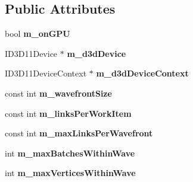 \subsection*{Public Attributes}
\begin{DoxyCompactItemize}
\item 
\hypertarget{classbt_soft_body_link_data_d_x11_s_i_m_d_aware_a5fefc76d6b7a597ec1ddf1413bb2bab8}{bool {\bfseries m\+\_\+on\+G\+P\+U}}\label{classbt_soft_body_link_data_d_x11_s_i_m_d_aware_a5fefc76d6b7a597ec1ddf1413bb2bab8}

\item 
\hypertarget{classbt_soft_body_link_data_d_x11_s_i_m_d_aware_a5b1221e69490190a31cefc6d1a7c8bd9}{I\+D3\+D11\+Device $\ast$ {\bfseries m\+\_\+d3d\+Device}}\label{classbt_soft_body_link_data_d_x11_s_i_m_d_aware_a5b1221e69490190a31cefc6d1a7c8bd9}

\item 
\hypertarget{classbt_soft_body_link_data_d_x11_s_i_m_d_aware_acfae9a8e37141082287b7c8b79c14f3a}{I\+D3\+D11\+Device\+Context $\ast$ {\bfseries m\+\_\+d3d\+Device\+Context}}\label{classbt_soft_body_link_data_d_x11_s_i_m_d_aware_acfae9a8e37141082287b7c8b79c14f3a}

\item 
\hypertarget{classbt_soft_body_link_data_d_x11_s_i_m_d_aware_a542df8cc3abbded86d3952ddae0a8bbb}{const int {\bfseries m\+\_\+wavefront\+Size}}\label{classbt_soft_body_link_data_d_x11_s_i_m_d_aware_a542df8cc3abbded86d3952ddae0a8bbb}

\item 
\hypertarget{classbt_soft_body_link_data_d_x11_s_i_m_d_aware_a18bd3a30a9a520c7bb2d6dda877d3b7b}{const int {\bfseries m\+\_\+links\+Per\+Work\+Item}}\label{classbt_soft_body_link_data_d_x11_s_i_m_d_aware_a18bd3a30a9a520c7bb2d6dda877d3b7b}

\item 
\hypertarget{classbt_soft_body_link_data_d_x11_s_i_m_d_aware_acae8bfcda1c51155a0cd0c2ff6b77431}{const int {\bfseries m\+\_\+max\+Links\+Per\+Wavefront}}\label{classbt_soft_body_link_data_d_x11_s_i_m_d_aware_acae8bfcda1c51155a0cd0c2ff6b77431}

\item 
\hypertarget{classbt_soft_body_link_data_d_x11_s_i_m_d_aware_acf5230a482233044f8e525369c02c7b8}{int {\bfseries m\+\_\+max\+Batches\+Within\+Wave}}\label{classbt_soft_body_link_data_d_x11_s_i_m_d_aware_acf5230a482233044f8e525369c02c7b8}

\item 
\hypertarget{classbt_soft_body_link_data_d_x11_s_i_m_d_aware_ae884949b87bfec748cd2c89d0252f7eb}{int {\bfseries m\+\_\+max\+Vertices\+Within\+Wave}}\label{classbt_soft_body_link_data_d_x11_s_i_m_d_aware_ae884949b87bfec748cd2c89d0252f7eb}


\end{DoxyCompactItemize}
